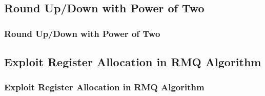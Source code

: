 \subsection{Round Up/Down with Power of Two}
\begin{frame}
	\frametitle{Round Up/Down with Power of Two}
	
\end{frame}

\subsection{Exploit Register Allocation in RMQ Algorithm}
\begin{frame}
	\frametitle{Exploit Register Allocation in RMQ Algorithm}
	
\end{frame}